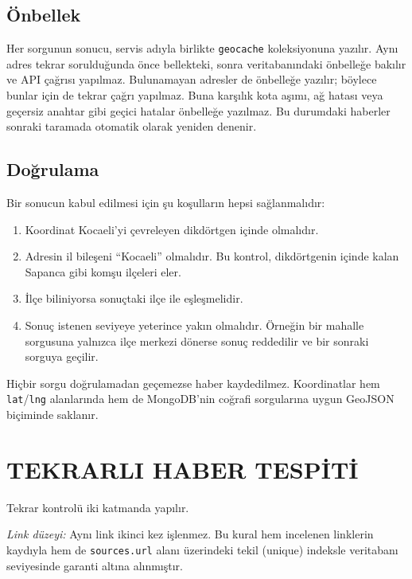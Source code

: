 \documentclass[conference,a4paper]{IEEEtran}
\begin{document}
\subsection{Önbellek}
Her sorgunun sonucu, servis adıyla birlikte \texttt{geocache} koleksiyonuna
yazılır. Aynı adres tekrar sorulduğunda önce bellekteki, sonra veritabanındaki
önbelleğe bakılır ve API çağrısı yapılmaz. Bulunamayan adresler de önbelleğe
yazılır; böylece bunlar için de tekrar çağrı yapılmaz. Buna karşılık kota aşımı,
ağ hatası veya geçersiz anahtar gibi geçici hatalar önbelleğe yazılmaz. Bu
durumdaki haberler sonraki taramada otomatik olarak yeniden denenir.

\subsection{Doğrulama}
Bir sonucun kabul edilmesi için şu koşulların hepsi sağlanmalıdır:
\begin{enumerate}
\item Koordinat Kocaeli'yi çevreleyen dikdörtgen içinde olmalıdır.
\item Adresin il bileşeni ``Kocaeli'' olmalıdır. Bu kontrol, dikdörtgenin içinde
kalan Sapanca gibi komşu ilçeleri eler.
\item İlçe biliniyorsa sonuçtaki ilçe ile eşleşmelidir.
\item Sonuç istenen seviyeye yeterince yakın olmalıdır. Örneğin bir mahalle
sorgusuna yalnızca ilçe merkezi dönerse sonuç reddedilir ve bir sonraki sorguya
geçilir.
\end{enumerate}
Hiçbir sorgu doğrulamadan geçemezse haber kaydedilmez. Koordinatlar hem
\texttt{lat}/\texttt{lng} alanlarında hem de MongoDB'nin coğrafi sorgularına
uygun GeoJSON biçiminde saklanır.

\section{TEKRARLI HABER TESPİTİ}\label{sec:tekrar}
Tekrar kontrolü iki katmanda yapılır.

\emph{Link düzeyi:} Aynı link ikinci kez işlenmez. Bu kural hem incelenen linklerin
kaydıyla hem de \texttt{sources.url} alanı üzerindeki tekil (unique) indeksle
veritabanı seviyesinde garanti altına alınmıştır.
\end{document}
